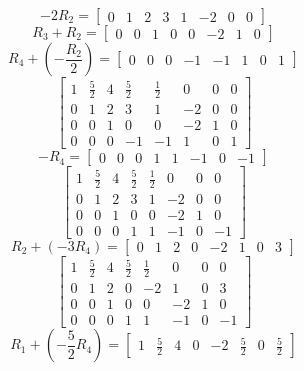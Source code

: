 \documentclass[11pt]{article}
\begin{document}
\[
    -2R_2 = 
    \left[
    \begin{array}{cccc|cccc}
        0 & 1 & 2 & 3 & 1 & -2 & 0 & 0
    \end{array}
    \right]
\]
\[
    R_3 + R_2 = 
    \left[
    \begin{array}{cccc|cccc}
        0 & 0 & 1 & 0 & 0 & -2 & 1 & 0
    \end{array}
    \right]
\]
\[
    R_4 + (-\frac{R_2}{2}) = 
    \left[
    \begin{array}{cccc|cccc}
        0 & 0 & 0 & -1 & -1 & 1 & 0 & 1
    \end{array}
    \right]
\]
\[
    \left[
    \begin{array}{cccc|cccc}
        1 & \frac{5}{2} & 4 & \frac{5}{2} & \frac{1}{2} & 0 & 0 & 0 \\
        0 & 1 & 2 & 3 & 1 & -2 & 0 & 0 \\
        0 & 0 & 1 & 0 & 0 & -2 & 1 & 0 \\
        0 & 0 & 0 & -1 & -1 & 1 & 0 & 1
    \end{array}
    \right]
\]
\[
    -R_4 = 
    \left[
    \begin{array}{cccc|cccc}
        0 & 0 & 0 & 1 & 1 & -1 & 0 & -1
    \end{array}
    \right]
\]
\[
    \left[
    \begin{array}{cccc|cccc}
        1 & \frac{5}{2} & 4 & \frac{5}{2} & \frac{1}{2} & 0 & 0 & 0 \\
        0 & 1 & 2 & 3 & 1 & -2 & 0 & 0 \\
        0 & 0 & 1 & 0 & 0 & -2 & 1 & 0 \\
        0 & 0 & 0 & 1 & 1 & -1 & 0 & -1
    \end{array}
    \right]
\]
\[
    R_2 + (-3R_4) = 
    \left[
    \begin{array}{cccc|cccc}
        0 & 1 & 2 & 0 & -2 & 1 & 0 & 3
    \end{array}
    \right]
\]
\[
    \left[
    \begin{array}{cccc|cccc}
        1 & \frac{5}{2} & 4 & \frac{5}{2} & \frac{1}{2} & 0 & 0 & 0 \\
        0 & 1 & 2 & 0 & -2 & 1 & 0 & 3 \\
        0 & 0 & 1 & 0 & 0 & -2 & 1 & 0 \\
        0 & 0 & 0 & 1 & 1 & -1 & 0 & -1
    \end{array}
    \right]
\]
\[
    R_1 + (-\frac{5}{2}R_4) = 
    \left[
    \begin{array}{cccc|cccc}
        1 & \frac{5}{2} & 4 & 0 & -2 & \frac{5}{2} & 0 & \frac{5}{2}
    \end{array}
    \right]
\]
\end{document}
